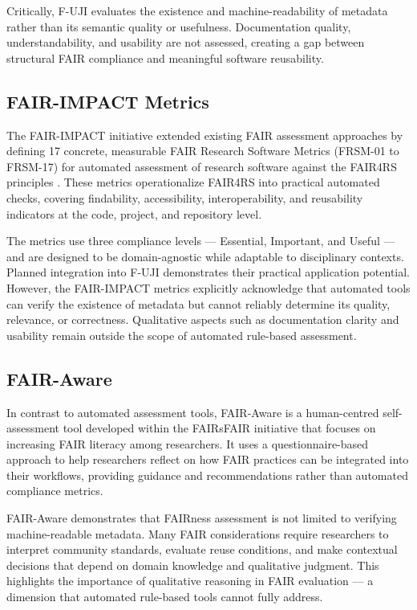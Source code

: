 Critically, F-UJI evaluates the existence and machine-readability of 
metadata rather than its semantic quality or usefulness. Documentation 
quality, understandability, and usability are not assessed, creating 
a gap between structural FAIR compliance and meaningful software 
reusability.

\subsection{FAIR-IMPACT Metrics}

The FAIR-IMPACT initiative extended existing FAIR assessment 
approaches by defining 17 concrete, measurable FAIR Research Software 
Metrics (FRSM-01 to FRSM-17) for automated assessment of research 
software against the FAIR4RS principles \cite{chuehong2025frsm}. 
These metrics operationalize FAIR4RS into practical automated checks, 
covering findability, accessibility, interoperability, and 
reusability indicators at the code, project, and repository level.

The metrics use three compliance levels — Essential, Important, and 
Useful — and are designed to be domain-agnostic while adaptable to 
disciplinary contexts. Planned integration into F-UJI demonstrates 
their practical application potential. However, the FAIR-IMPACT 
metrics explicitly acknowledge that automated tools can verify the 
existence of metadata but cannot reliably determine its quality, 
relevance, or correctness. Qualitative aspects such as documentation 
clarity and usability remain outside the scope of automated rule-based 
assessment.

\subsection{FAIR-Aware}

In contrast to automated assessment tools, FAIR-Aware is a 
human-centred self-assessment tool \cite{akerman2021fairaware} developed within the FAIRsFAIR 
initiative that focuses on increasing FAIR literacy among researchers. 
It uses a questionnaire-based approach to help researchers reflect on 
how FAIR practices can be integrated into their workflows, providing 
guidance and recommendations rather than automated compliance metrics.

FAIR-Aware demonstrates that FAIRness assessment is not limited to 
verifying machine-readable metadata. Many FAIR considerations require 
researchers to interpret community standards, evaluate reuse 
conditions, and make contextual decisions that depend on domain 
knowledge and qualitative judgment. This highlights the importance of 
qualitative reasoning in FAIR evaluation — a dimension that automated 
rule-based tools cannot fully address.

